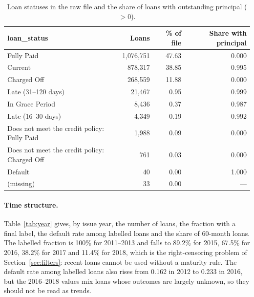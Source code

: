 \begin{table}[H]
\centering
\caption{Loan statuses in the raw file and the share of loans with outstanding principal ($>0$).}
\label{tab:status}
\small
\begin{tabular}{lrrr}
\toprule
\textbf{loan\_status} & \textbf{Loans} & \textbf{\% of file} & \textbf{Share with principal} \\
\midrule
Fully Paid & 1,076,751 & 47.63 & 0.000 \\
Current & 878,317 & 38.85 & 0.995 \\
Charged Off & 268,559 & 11.88 & 0.000 \\
Late (31--120 days) & 21,467 & 0.95 & 0.999 \\
In Grace Period & 8,436 & 0.37 & 0.987 \\
Late (16--30 days) & 4,349 & 0.19 & 0.992 \\
Does not meet the credit policy: Fully Paid & 1,988 & 0.09 & 0.000 \\
Does not meet the credit policy: Charged Off & 761 & 0.03 & 0.000 \\
Default & 40 & 0.00 & 1.000 \\
(missing) & 33 & 0.00 & --- \\
\bottomrule
\end{tabular}
\end{table}

\paragraph{Time structure.} Table~\ref{tab:year} gives, by issue year, the number of loans, the fraction with a final label, the default rate among labelled loans and the share of 60-month loans. The labelled fraction is 100\% for 2011--2013 and falls to 89.2\% for 2015, 67.5\% for 2016, 38.2\% for 2017 and 11.4\% for 2018, which is the right-censoring problem of Section~\ref{sec:filters}: recent loans cannot be used without a maturity rule. The default rate among labelled loans also rises from 0.162 in 2012 to 0.233 in 2016, but the 2016--2018 values mix loans whose outcomes are largely unknown, so they should not be read as trends.

